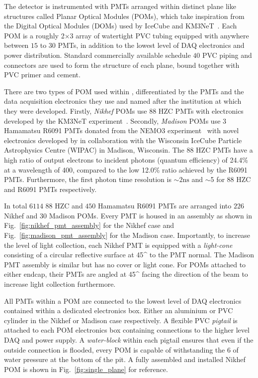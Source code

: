 The \chipsfive detector is instrumented with PMTs arranged within distinct plane like structures
called Planar Optical Modules (POMs), which take inspiration from the Digital Optical Modules
(DOMs) used by IceCube and KM3NeT~\cite{hanson2006, eijk2015}. Each POM is a roughly
\unit{2}{}$\times$\unit{3}{} array of watertight PVC tubing equipped with
anywhere between $15$ to $30$ PMTs, in addition to the lowest level of DAQ electronics and power
distribution. Standard commercially available schedule $40$ PVC piping and connectors are used to
form the structure of each plane, bound together with PVC primer and cement.

There are two types of POM used within \chipsfive, differentiated by the PMTs and the data
acquisition electronics they use and named after the institution at which they were developed.
Firstly, \emph{Nikhef} POMs use \unit{88}{} HZC PMTs with electronics developed by the
KM3NeT experiment~\cite{katz2009, adrian2016}. Secondly, \emph{Madison} POMs use
\unit{3}{} Hamamatsu R6091 PMTs donated from the NEMO3 experiment~\cite{arnold2005}
with novel electronics developed by \chips in collaboration with the Wisconsin IceCube Particle
Astrophysics Centre (WIPAC) in Madison, Wisconsin. The \unit{88}{} HZC PMTs have a high
ratio of output electrons to incident photons (quantum efficiency) of 24.4\% at a wavelength of
\unit{400}{}, compared to the low 12.0\% ratio achieved by the R6091 PMTs. Furthermore,
the first photon time resolution is $\sim2\mathrm{ns}$ and $\sim$\unit{5}{} for
\unit{88}{} HZC and R6091 PMTs respectively.

In total $6114$ \unit{88}{} HZC and $450$ Hamamatsu R6091 PMTs are arranged into $226$
Nikhef and $30$ Madison POMs. Every PMT is housed in an assembly as shown in
Fig.~\ref{fig:nikhef_pmt_assembly} for the Nikhef case and Fig.~\ref{fig:madison_pmt_assembly} for
the Madison case. Importantly, to increase the level of light collection, each Nikhef PMT is
equipped with a \emph{light-cone} consisting of a circular reflective surface at \unit{45}{^\circ}
to the PMT normal. The Madison PMT assembly is similar but has no cover or light cone. For POMs
attached to either endcap, their PMTs are angled at \unit{45}{^\circ} facing the direction of the
beam to increase light collection furthermore.

All PMTs within a POM are connected to the lowest level of DAQ electronics contained within a
dedicated electronics box. Either an aluminium or PVC cylinder in the Nikhef or Madison case
respectively. A flexible PVC \emph{pigtail} is attached to each POM electronics box containing
connections to the higher level DAQ and power supply. A \emph{water-block} within each pigtail
ensures that even if the outside connection is flooded, every POM is capable of withstanding the
\unit{6}{} of water pressure at the bottom of the pit. A fully assembled and installed
Nikhef POM is shown in Fig.~\ref{fig:single_plane} for reference.


